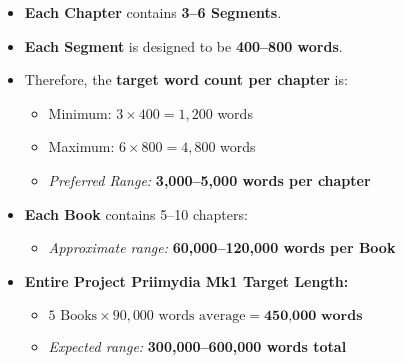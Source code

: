 \documentclass[9pt]{article}
\begin{document}
\begin{itemize}
  \item \textbf{Each Chapter} contains \textbf{3–6 Segments}.
  \item \textbf{Each Segment} is designed to be \textbf{400–800 words}.
  \item Therefore, the \textbf{target word count per chapter} is:
    \begin{itemize}
      \item Minimum: $3 \times 400 = 1,200$ words
      \item Maximum: $6 \times 800 = 4,800$ words
      \item \textit{Preferred Range:} \textbf{3,000–5,000 words per chapter}
    \end{itemize}
  \item \textbf{Each Book} contains 5–10 chapters:
    \begin{itemize}
      \item \textit{Approximate range:} \textbf{60,000–120,000 words per Book}
    \end{itemize}
  \item \textbf{Entire Project Priimydia Mk1 Target Length:}
    \begin{itemize}
      \item $5 \text{ Books} \times 90,000 \text{ words average} = \textbf{450,000 words}$
      \item \textit{Expected range:} \textbf{300,000–600,000 words total}
    \end{itemize}
\end{itemize}
\end{document}
